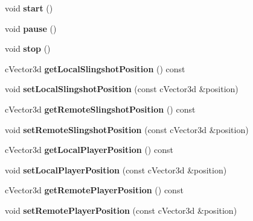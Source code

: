 \begin{DoxyCompactItemize}
\item 
\hypertarget{classGame_a3d9b98f7c4a96ecf578f75b96c9f0e90}{
void {\bfseries start} ()}
\label{classGame_a3d9b98f7c4a96ecf578f75b96c9f0e90}

\item 
\hypertarget{classGame_a4b507ab6c09910b3a621cf1980d65604}{
void {\bfseries pause} ()}
\label{classGame_a4b507ab6c09910b3a621cf1980d65604}

\item 
\hypertarget{classGame_a17fbb36fd4a2085f9ff4f1fa93d7d08b}{
void {\bfseries stop} ()}
\label{classGame_a17fbb36fd4a2085f9ff4f1fa93d7d08b}

\item 
\hypertarget{classGame_aab451f2c3ec02c5a0282b58ab19ebdab}{
cVector3d {\bfseries getLocalSlingshotPosition} () const }
\label{classGame_aab451f2c3ec02c5a0282b58ab19ebdab}

\item 
\hypertarget{classGame_a1cd832f27a46802def164569fc2dd6ed}{
void {\bfseries setLocalSlingshotPosition} (const cVector3d \&position)}
\label{classGame_a1cd832f27a46802def164569fc2dd6ed}

\item 
\hypertarget{classGame_add72eb62274c4401f4176cf3a46f3e2c}{
cVector3d {\bfseries getRemoteSlingshotPosition} () const }
\label{classGame_add72eb62274c4401f4176cf3a46f3e2c}

\item 
\hypertarget{classGame_acd24ee64929223da87840f28d7a5fade}{
void {\bfseries setRemoteSlingshotPosition} (const cVector3d \&position)}
\label{classGame_acd24ee64929223da87840f28d7a5fade}

\item 
\hypertarget{classGame_acf57e15005800c867112028148507649}{
cVector3d {\bfseries getLocalPlayerPosition} () const }
\label{classGame_acf57e15005800c867112028148507649}

\item 
\hypertarget{classGame_abfdbfb316ff74d0cd5f5a175e84a4e66}{
void {\bfseries setLocalPlayerPosition} (const cVector3d \&position)}
\label{classGame_abfdbfb316ff74d0cd5f5a175e84a4e66}

\item 
\hypertarget{classGame_ae4280d23a5374831afe17ad884247903}{
cVector3d {\bfseries getRemotePlayerPosition} () const }
\label{classGame_ae4280d23a5374831afe17ad884247903}

\item 
\hypertarget{classGame_a24eea0f5f958f43274073caad37b2317}{
void {\bfseries setRemotePlayerPosition} (const cVector3d \&position)}
\label{classGame_a24eea0f5f958f43274073caad37b2317}


\end{DoxyCompactItemize}
